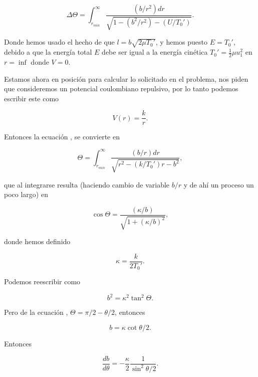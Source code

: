 \documentclass[a4paper,10pt]{article}
\numberwithin{equation}{section}
\begin{document}
\begin{equation}
 \Delta \Theta = \int_{r_{min}}^{\infty} \frac{(b/r^2)dr}{\sqrt{1 -
 (b^2/r^2) - (U/T_0')}}.
 \label{eq:disper9}
\end{equation}

Donde hemos usado el hecho de que $l=b\sqrt{2\mu T_0'}$, y hemos puesto 
$E = T_0'$, debido a que la energía total $E$ debe ser igual a la energía
cinética $T_0'=\frac{1}{2} \mu u_1^2$ en $r=\inf$ donde $V=0$.

\vspace{.3cm}

Estamos ahora en posición para calcular lo solicitado en el problema, nos piden
que consideremos un potencial coulombiano repulsivo, por lo tanto podemos 
escribir este como

\begin{equation}
 V(r) = \frac{k}{r}.
 \label{eq:coulombPot}
\end{equation}

Entonces la ecuación , se convierte en

\begin{equation}
 \Theta = \int_{r_{min}}^{\infty} \frac{(b/r)dr}{\sqrt{r^2-(k/T_0')r-b^2}},
\end{equation}

que al integrarse resulta (haciendo cambio de variable $b/r$ y de ahí un
proceso un poco largo) en

\begin{equation}
 \cos{\Theta} = \frac{(\kappa/b)}{\sqrt{1+(\kappa/b)^2}},
 \label{eq:CosThet}
\end{equation}

donde hemos definido

\begin{equation}
 \kappa = \frac{k}{2T_0'}.
\end{equation}

Podemos reescribir  como

\begin{equation}
 b^2=\kappa^2 \tan^2{\Theta}.
\end{equation}

Pero de la ecuación , $\Theta = \pi /2 - \theta/2$,
entonces

\begin{equation}
 b = \kappa \cot{\theta/2}.
\end{equation}

Entonces

\begin{equation}
\frac{db}{d\theta} = - \frac{\kappa}{2} \frac{1}{\sin^2{\theta/2}}.
\end{equation}
\end{document}
